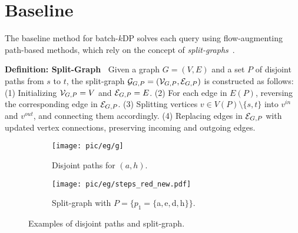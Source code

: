 \section{Baseline} \label{sec:splitgraph}

The baseline method for batch-$k$DP solves each query using flow-augmenting path-based methods, which rely on the concept of \textit{split-graphs}~\cite{baseline_moreverbose, baseline1step2, baselineOnlySplitP1}. 

\textbf{Definition: Split-Graph~\cite{baselineOnlySplitP1}} 
Given a graph \( G = (V, E) \) and a set \( P \) of disjoint paths from \( s \) to \( t \), the split-graph \( \mathcal{G}_{G,P} = (\mathcal{V}_{G,P}, \mathcal{E}_{G,P}) \) is constructed as follows:
(1) Initializing \( \mathcal{V}_{G,P} = V \) and \( \mathcal{E}_{G,P} = E \).
(2) For each edge in \( E(P) \), reversing the corresponding edge in \( \mathcal{E}_{G,P} \).
(3) Splitting vertices \(v \in V(P) \setminus \{s, t\}\) into \(v^{in}\) and \(v^{out}\), and connecting them accordingly.
(4) Replacing edges in \(\mathcal{E}_{G,P}\) with updated vertex connections, preserving incoming and outgoing edges.



\begin{figure}[h!]
\newcommand{\mylinewidth}{\linewidth}
\centering
    \begin{subfigure}[t]{0.35\mylinewidth}
        \centering
        {\texttt{[image: pic/eg/g]}}
        \caption{Disjoint paths for $(a, h)$.}
        \label{fig:g}
    \end{subfigure}
    \begin{subfigure}[t]{0.6\mylinewidth}
        \centering
        {\texttt{[image: pic/eg/steps\_red\_new.pdf]}}
        \caption{Split-graph with $P= \{p_1=\{$a$, $e$, $d$, $h$\}\}$.}
        \label{fig:eg_split}
    \end{subfigure}
    \caption{Examples of disjoint paths and split-graph.}
\end{figure} 

